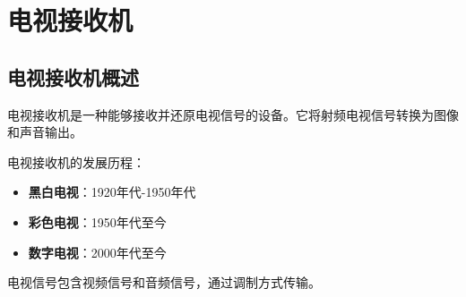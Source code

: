 
\chapter{电视接收机}
\label{chap:television_receiver}

\section{电视接收机概述}
\label{sec:tv_receiver_intro}

电视接收机是一种能够接收并还原电视信号的设备。它将射频电视信号转换为图像和声音输出。

电视接收机的发展历程：
\begin{itemize}
    \item \textbf{黑白电视}：1920年代-1950年代
    \item \textbf{彩色电视}：1950年代至今
    \item \textbf{数字电视}：2000年代至今
\end{itemize}

电视信号包含视频信号和音频信号，通过调制方式传输。

